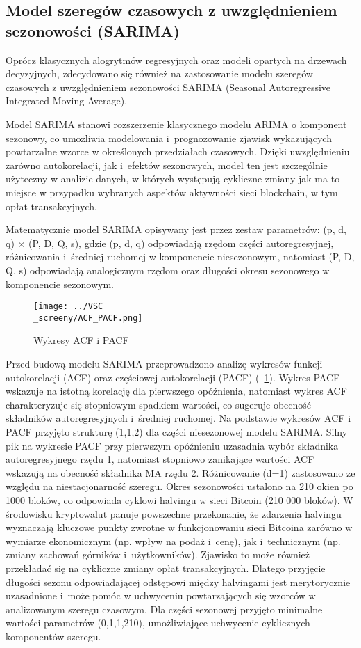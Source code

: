 \documentclass[12pt,a4paper]{report}
\theoremstyle{definition} %
\begin{document}
	\subsection{Model szeregów czasowych z uwzględnieniem sezonowości (SARIMA)}
	\hspace*{\parindent}Oprócz klasycznych alogrytmów regresyjnych oraz modeli opartych na drzewach decyzyjnych, zdecydowano się również na zastosowanie modelu szeregów czasowych z uwzględnieniem sezonowości SARIMA (Seasonal Autoregressive Integrated Moving Average).

	Model SARIMA stanowi rozszerzenie klasycznego modelu ARIMA o komponent sezonowy, co umożliwia modelowania i~prognozowanie zjawisk wykazujących powtarzalne wzorce w określonych przedziałach czasowych. Dzięki uwzględnieniu zarówno autokorelacji, jak i~efektów sezonowych, model ten jest szczególnie użyteczny w analizie danych, w których występują cykliczne zmiany jak ma to miejsce w przypadku wybranych aspektów aktywności sieci blockchain, w tym opłat transakcyjnych.

Matematycznie model SARIMA opisywany jest przez zestaw parametrów: (p, d, q) × (P, D, Q, s), gdzie (p, d, q) odpowiadają rzędom części autoregresyjnej, różnicowania i~średniej ruchomej w komponencie niesezonowym, natomiast (P, D, Q, s) odpowiadają analogicznym rzędom oraz długości okresu sezonowego w komponencie sezonowym. 
	
	\begin{figure}[H]
	    \centering
	    \texttt{[image: ../VSC\\\_screeny/ACF\_PACF.png]} 
	    \caption{Wykresy ACF i PACF}
	    \label{fig:ACFiPACF}
	\end{figure}

	Przed budową modelu SARIMA przeprowadzono analizę wykresów funkcji autokorelacji (ACF) oraz częściowej autokorelacji (PACF) (\figurename~\ref{fig:ACFiPACF}). Wykres PACF wskazuje na istotną korelację dla pierwszego opóźnienia, natomiast wykres ACF charakteryzuje się stopniowym spadkiem wartości, co sugeruje obecność składników autoregresyjnych i~średniej ruchomej. Na podstawie wykresów ACF i PACF przyjęto strukturę (1,1,2) dla części niesezonowej modelu SARIMA. Silny pik na wykresie PACF przy pierwszym opóźnieniu uzasadnia wybór składnika autoregresyjnego rzędu 1, natomiast stopniowo zanikające wartości ACF wskazują na obecność składnika MA rzędu 2. Różnicowanie (d=1) zastosowano ze względu na niestacjonarność szeregu. Okres sezonowości ustalono na 210 okien po 1000 bloków, co odpowiada cyklowi halvingu w sieci Bitcoin (210 000 bloków).  W środowisku kryptowalut panuje powszechne przekonanie, że zdarzenia halvingu wyznaczają kluczowe punkty zwrotne w funkcjonowaniu sieci Bitcoina zarówno w wymiarze ekonomicznym (np. wpływ na podaż i~cenę), jak i~technicznym (np. zmiany zachowań górników i~użytkowników). Zjawisko to może również przekładać się na cykliczne zmiany opłat transakcyjnych. Dlatego przyjęcie długości sezonu odpowiadającej odstępowi między halvingami jest merytorycznie uzasadnione i~może pomóc w uchwyceniu powtarzających się wzorców w analizowanym szeregu czasowym.  Dla części sezonowej przyjęto minimalne wartości parametrów (0,1,1,210), umożliwiające uchwycenie cyklicznych komponentów szeregu.
\end{document}
